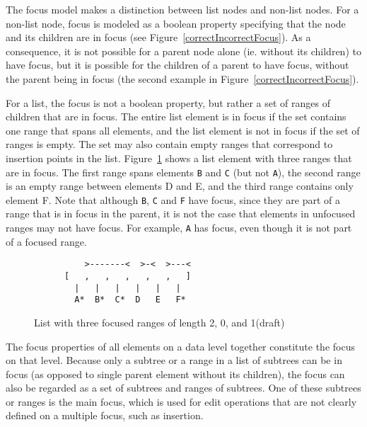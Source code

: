 The focus model makes a distinction between list nodes and non-list nodes. For a non-list node, focus is modeled as a boolean property specifying that the node and its children are in focus (see Figure~\ref{correctIncorrectFocus}). As a consequence, it is not possible for a parent node alone (ie. without its children) to have focus, but it is possible for the children of a parent to have focus, without the parent being in focus (the second example in Figure~\ref{correctIncorrectFocus}).

For a list, the focus is not a boolean property, but rather a set of ranges of children that are in focus. The entire list element is in focus if the set contains one range that spans all elements, and the list element is not in focus if the set of ranges is empty. The set may also contain empty ranges that correspond to insertion points in the list. Figure~\ref{listFocus} shows a list element with three ranges that are in focus. The first range spans elements \verb|B| and \verb|C| (but not \verb|A|), the second range is an empty range between elements D and E, and the third range contains only element F. Note that although \verb|B|, \verb|C| and \verb|F| have focus, since they are part of a range that is in focus in the parent, it is not the case that elements in unfocused ranges may not have focus. For example, \verb|A| has focus, even though it is not part of a focused range. 

\begin{figure}
\begin{small}
\begin{center}
\begin{verbatim}
          >-------<  >-<  >---<          
      [   ,   ,   ,   ,   ,   ]
        |   |   |   |   |   |
        A*  B*  C*  D   E   F*

\end{verbatim}
\caption{List with three focused ranges of length 2, 0, and 1(draft)}\label{listFocus} 
\end{center}
\end{small}
\end{figure}


The focus properties of all elements on a data level together constitute the focus on that level. Because only a subtree or a range in a list of subtrees can be in focus (as opposed to single parent element without its children), the focus can also be regarded as a set of subtrees and ranges of subtrees. One of these subtrees or ranges is the main focus, which is used for edit operations that are not clearly defined on a multiple focus, such as insertion.

